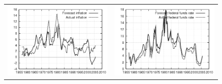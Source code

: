 \documentclass{beamer}
\begin{document}
{\begin{figure}[ht]
\begin{center}
\begin{tabular}{cc}
\includegraphics[scale=0.3]{plots/k_gh_fe_pi.png} & \includegraphics[scale=0.3]{plots/k_gh_fe_r.png}  \\
\end{tabular}
\end{center}
\end{figure}
}
\end{document}
